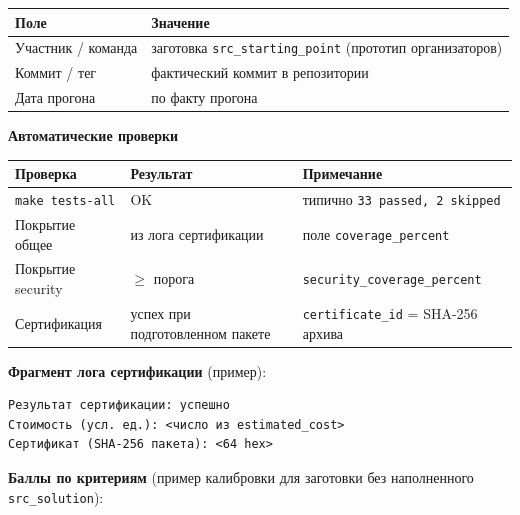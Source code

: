 \begin{tabularx}{\textwidth}{@{}l X@{}}
\toprule
\textbf{Поле} & \textbf{Значение} \\
\midrule
Участник / команда & заготовка \texttt{src\_starting\_point} (прототип организаторов) \\
Коммит / тег & фактический коммит в репозитории \\
Дата прогона & по факту прогона \\
\bottomrule
\end{tabularx}

\vspace{0.8em}
\noindent\textbf{Автоматические проверки}

\begin{tabularx}{\textwidth}{@{}l X X@{}}
\toprule
Проверка & Результат & Примечание \\
\midrule
\texttt{make tests-all} & OK & типично \texttt{33 passed, 2 skipped} \\
Покрытие общее & из лога сертификации & поле \texttt{coverage\_percent} \\
Покрытие security & $\geq$ порога & \texttt{security\_coverage\_percent} \\
Сертификация & успех при подготовленном пакете & \texttt{certificate\_id} = SHA-256 архива \\
\bottomrule
\end{tabularx}

\vspace{0.8em}
\noindent\textbf{Фрагмент лога сертификации} (пример):

\begin{verbatim}
Результат сертификации: успешно
Стоимость (усл. ед.): <число из estimated_cost>
Сертификат (SHA-256 пакета): <64 hex>
\end{verbatim}

\vspace{0.8em}
\noindent\textbf{Баллы по критериям} (пример калибровки для заготовки без наполненного \texttt{src\_solution}):

